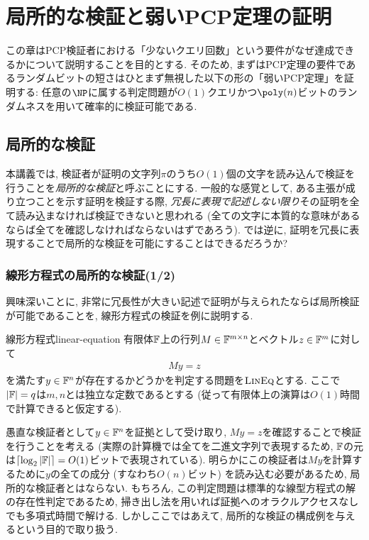 \chapter{局所的な検証と弱いPCP定理の証明}

この章はPCP検証者における「少ないクエリ回数」という要件がなぜ達成できるかについて説明することを目的とする.
そのため, まずはPCP定理の要件であるランダムビットの短さはひとまず無視した以下の形の「弱いPCP定理」を証明する: 任意の$\NP$に属する判定問題が$O(1)$クエリかつ$\poly(n)$ビットのランダムネスを用いて確率的に検証可能である.

\section{局所的な検証}
本講義では, 検証者が証明の文字列$\pi$のうち$O(1)$個の文字を読み込んで検証を行うことを\emph{局所的な検証}と呼ぶことにする.
一般的な感覚として, ある主張が成り立つことを示す証明を検証する際, \emph{冗長に表現で記述しない限り}その証明を全て読み込まなければ検証できないと思われる (全ての文字に本質的な意味があるならば全てを確認しなければならないはずであろう).
では逆に, 証明を冗長に表現することで局所的な検証を可能にすることはできるだろうか?

\subsection{線形方程式の局所的な検証(1/2)}
興味深いことに, 非常に冗長性が大きい記述で証明が与えられたならば局所検証が可能であることを, 線形方程式の検証を例に説明する.

\begin{definition}{線形方程式}{linear-equation}
有限体$\mathbb{F}$上の行列$M\in\mathbb{F}^{m\times n}$とベクトル$z\in\mathbb{F}^m$に対して
\begin{align*}
  My = z
\end{align*}
を満たす$y\in\mathbb{F}^n$が存在するかどうかを判定する問題を$\textsc{LinEq}$とする.
ここで$\abs{\mathbb{F}}=q$は$m,n$とは独立な定数であるとする (従って有限体上の演算は$O(1)$時間で計算できると仮定する).
\end{definition}

愚直な検証者として$y\in\mathbb{F}^n$を証拠として受け取り, $My=z$を確認することで検証を行うことを考える (実際の計算機では全てを二進文字列で表現するため, $\mathbb{F}$の元は$\lceil\log_2\abs{\mathbb{F}}\rceil=O(1)$ビットで表現されている).
明らかにこの検証者は$My$を計算するために$y$の全ての成分 (すなわち$O(n)$ビット) を読み込む必要があるため, 局所的な検証者とはならない.
もちろん, この判定問題は標準的な線型方程式の解の存在性判定であるため, 掃き出し法を用いれば証拠へのオラクルアクセスなしでも多項式時間で解ける.
しかしここではあえて, 局所的な検証の構成例を与えるという目的で取り扱う.

